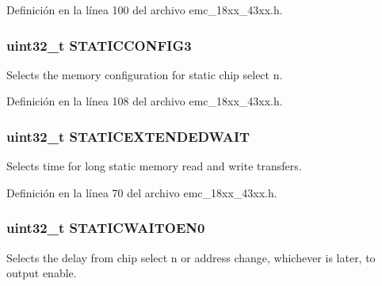 Definición en la línea 100 del archivo emc\+\_\+18xx\+\_\+43xx.\+h.

\subsubsection[{\texorpdfstring{S\+T\+A\+T\+I\+C\+C\+O\+N\+F\+I\+G3}{STATICCONFIG3}}]{ uint32\+\_\+t S\+T\+A\+T\+I\+C\+C\+O\+N\+F\+I\+G3}\hypertarget{struct_l_p_c___e_m_c___t_af438dbb97c449c7c78934b260a568dcc}{}\label{struct_l_p_c___e_m_c___t_af438dbb97c449c7c78934b260a568dcc}
Selects the memory configuration for static chip select n. 

Definición en la línea 108 del archivo emc\+\_\+18xx\+\_\+43xx.\+h.

\subsubsection[{\texorpdfstring{S\+T\+A\+T\+I\+C\+E\+X\+T\+E\+N\+D\+E\+D\+W\+A\+IT}{STATICEXTENDEDWAIT}}]{ uint32\+\_\+t S\+T\+A\+T\+I\+C\+E\+X\+T\+E\+N\+D\+E\+D\+W\+A\+IT}\hypertarget{struct_l_p_c___e_m_c___t_a4b06e90b495816ad321ae65fec69d375}{}\label{struct_l_p_c___e_m_c___t_a4b06e90b495816ad321ae65fec69d375}
Selects time for long static memory read and write transfers. 

Definición en la línea 70 del archivo emc\+\_\+18xx\+\_\+43xx.\+h.

\subsubsection[{\texorpdfstring{S\+T\+A\+T\+I\+C\+W\+A\+I\+T\+O\+E\+N0}{STATICWAITOEN0}}]{ uint32\+\_\+t S\+T\+A\+T\+I\+C\+W\+A\+I\+T\+O\+E\+N0}\hypertarget{struct_l_p_c___e_m_c___t_a0e7a692e1cb24fa958a2dd8738b46f4b}{}\label{struct_l_p_c___e_m_c___t_a0e7a692e1cb24fa958a2dd8738b46f4b}
Selects the delay from chip select n or address change, whichever is later, to output enable. 


